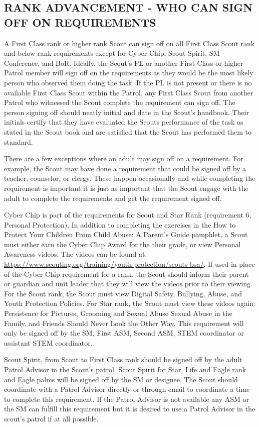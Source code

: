 \documentclass{ltxguide}
\begin{document}
\subsection{RANK ADVANCEMENT - WHO CAN SIGN OFF ON REQUIREMENTS}
A First Class rank or higher rank Scout can sign off on all First Class Scout rank and below rank requirements except for Cyber Chip, Scout Spirit, \ac{SM} Conference, and \ac{BoR}. Ideally, the Scout's \ac{PL} or another First Class-or-higher Patrol member will sign off on the requirements as they would be the most likely person who observed them doing the task. If the \ac{PL} is not present or there is no available First Class Scout within the Patrol, any First Class Scout from another Patrol who witnessed the Scout complete the requirement can sign off. The person signing off should neatly initial and date in the Scout's handbook. Their initials certify that they have evaluated the Scouts performance of the task as stated in the Scout book and are satisfied that the Scout has performed them to standard.

There are a few exceptions where an adult may sign off on a requirement. For example, the Scout may have done a requirement that could be signed off by a teacher, counselor, or clergy. These happen occasionally and while completing the requirement is important it is just as important that the Scout engage with the adult to complete the requirements and get the requirement signed off.

Cyber Chip is part of the requirements for Scout and Star Rank (requirement 6, Personal Protection). In addition to completing the exercises in the How to Protect Your Children From Child Abuse: A Parent's Guide pamphlet, a Scout must either earn the Cyber Chip Award for the their grade, or view Personal Awareness videos.  The videos can be found at: \url{https://www.scouting.org/training/youth-protection/scouts-bsa/}. If used in place of the Cyber Chip requirement for a rank, the Scout should inform their parent or guardian and unit leader that they will view the videos prior to their viewing. For the Scout rank, the Scout must view Digital Safety, Bullying, Abuse, and Youth Protection Policies. For Star rank, the Scout must view these videos again: Persistence for Pictures, Grooming and Sexual Abuse Sexual Abuse in the Family, and Friends Should Never Look the Other Way. This requirement will only be signed off by the SM, First \ac{ASM}, Second \ac{ASM}, STEM coordinator or assistant STEM coordinator.

Scout Spirit, from Scout to First Class rank should be signed off by the adult Patrol Advisor in the Scout's patrol. Scout Spirit for Star, Life and Eagle rank and Eagle palms will be signed off by the \ac{SM} or designee. The Scout should coordinate with a Patrol Advisor directly or through email to coordinate a time to complete this requirement. If the Patrol Advisor is not available any \ac{ASM} or the \ac{SM} can fulfill this requirement but it is desired to use a Patrol Advisor in the scout's patrol if at all possible.
\end{document}
